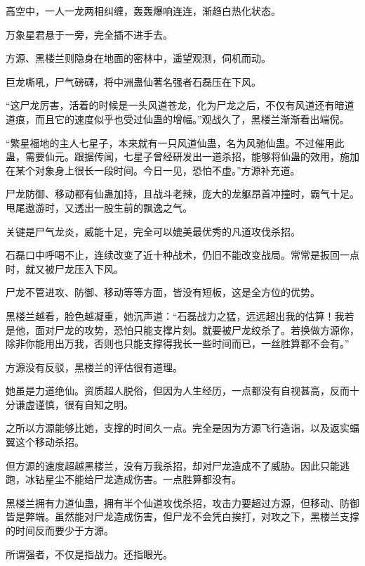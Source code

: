 
\begin{this_body}



高空中，一人一龙两相纠缠，轰轰爆响连连，渐趋白热化状态。

万象星君悬于一旁，完全插不进手去。

方源、黑楼兰则隐身在地面的密林中，遥望观测，伺机而动。

巨龙嘶吼，尸气磅礴，将中洲蛊仙著名强者石磊压在下风。

“这尸龙厉害，活着的时候是一头风道苍龙，化为尸龙之后，不仅有风道还有暗道道痕，而且它的速度似乎也受过仙蛊的增幅。”观战久了，黑楼兰渐渐看出端倪。

“繁星福地的主人七星子，本来就有一只风道仙蛊，名为风驰仙蛊。不过催用此蛊，需要仙元。跟据传闻，七星子曾经研发出一道杀招，能够将仙蛊的效用，施加在某个对象身上很长一段时间。今日一见，恐怕不虚。”方源补充道。

尸龙防御、移动都有仙蛊加持，且战斗老辣，庞大的龙躯昂首冲撞时，霸气十足。甩尾遨游时，又透出一股生前的飘逸之气。

关键是尸气龙炎，威能十足，完全可以媲美最优秀的凡道攻伐杀招。

石磊口中呼喝不止，连续改变了近十种战术，仍旧不能改变战局。常常是扳回一点时，就又被尸龙压入下风。

尸龙不管进攻、防御、移动等等方面，皆没有短板，这是全方位的优势。

黑楼兰越看，脸色越凝重，她沉声道：“石磊战力之猛，远远超出我的估算！我若是他，面对尸龙的攻势，恐怕只能支撑片刻。就要被尸龙绞杀了。若换做方源你，除非你能用出万我，否则也只能支撑得我长一些时间而已，一丝胜算都不会有。”

方源没有反驳，黑楼兰的评估很有道理。

她虽是力道绝仙。资质超人脱俗，但因为人生经历，一点都没有自视甚高，反而十分谦虚谨慎，很有自知之明。

之所以方源能够比她，支撑的时间久一点。完全是因为方源飞行造诣，以及返实蝠翼这个移动杀招。

但方源的速度超越黑楼兰，没有万我杀招，却对尸龙造成不了威胁。因此只能逃跑，冰钻星尘不能给尸龙造成伤害。一点胜算都没有。

黑楼兰拥有力道仙蛊，拥有半个仙道攻伐杀招，攻击力要超过方源，但移动、防御皆是弊端。虽然能对尸龙造成伤害，但尸龙不会凭白挨打，对攻之下，黑楼兰支撑的时间反而要少于方源。

所谓强者，不仅是指战力。还指眼光。


\end{this_body}
